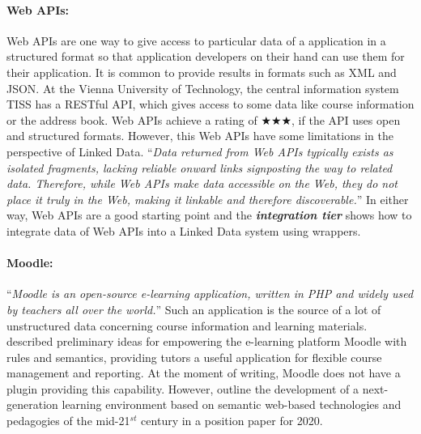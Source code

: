 \documentclass{article}
\begin{document}
\paragraph{Web APIs:} Web APIs are one way to give access to particular data of a application in a structured format so that application developers on their hand can use them for their application. It is common to provide results in formats such as XML and JSON. At the Vienna University of Technology, the central information system TISS has a RESTful API, which gives access to some data like course information or the address book. Web APIs achieve a rating of $\bigstar\bigstar\bigstar$, if the API uses open and structured formats. However, this Web APIs have some limitations in the perspective of Linked Data. ``\textit{Data returned from Web APIs typically exists as isolated fragments, lacking reliable onward links signposting the way to related data. Therefore, while Web APIs make data accessible on the Web, they do not place it truly in the Web, making it linkable and therefore discoverable.}''\cite{heath_linked_2011} In either way, Web APIs are a good starting point and the \textit{\textbf{integration tier}} shows how to integrate data of Web APIs into a Linked Data system using wrappers.

\paragraph{Moodle:} ``\textit{Moodle is an open-source e-learning application, written in PHP and widely used by teachers all over the world.}''\cite{lukichev_empowering_????} Such an application is the source of a lot of unstructured data concerning course information and learning materials. \citet{lukichev_empowering_????} described preliminary ideas for empowering the e-learning platform Moodle with rules and semantics, providing tutors a useful application for flexible course management and reporting. At the moment of writing, Moodle does not have a plugin providing this capability. However, \citet{holtham_moodle_2012} outline the development of a next-generation learning environment based on semantic web-based technologies and pedagogies of the mid-21$^{st}$ century in a position paper for 2020.
\end{document}
